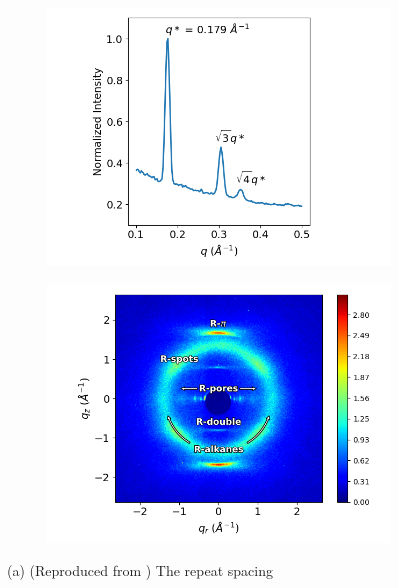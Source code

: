 \documentclass[journal=jpcbfk,manusciprt=article]{achemso}
\begin{document}
  \begin{figure}[!htb]
        \centering
        \begin{subfigure}[t]{0.43\linewidth}
                \centering
                \includegraphics[width=\linewidth]{SAXS.png}
                \caption{}\label{fig:SAXS}
        \end{subfigure}
        \begin{subfigure}[t]{0.47\linewidth}
                \centering
                \includegraphics[width=\linewidth]{WAXS_annotated_words.png} 
                \caption{}\label{fig:WAXS}
        \end{subfigure}
	\caption{(a) (Reproduced from ) The repeat spacing
}
\end{figure}
\end{document}
